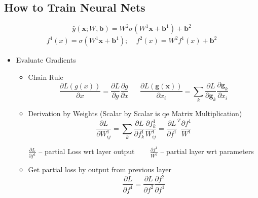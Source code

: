 \documentclass{beamer}
\begin{document}
	
	\subsection*{How to Train Neural Nets}
	
		\begin{frame}
			
				{\small
					$$
					\hat{y}(\bm{x}; W, \bm{b}) = W^2\sigma(W^1\bm{x} + \bm{b}^1 ) + \bm{b}^2
					$$
					\begin{align*}
						f^1 (x)  = \sigma(W^1\bm{x} + \bm{b}^1 ); ~~~~~
						f^2 (x)  = W^2f^1(x) + \bm{b}^2
					\end{align*}}
				
			\begin{itemize}
				\item Evaluate Gradients
				\begin{itemize}
					\item Chain Rule
					$$
						\frac {\partial L(g(x))}{\partial x} = 
							\frac{\partial L}{\partial g} 
							\frac{\partial g}{\partial x}~~~~~~~
						\frac {\partial L(\bm{g}(\bm{x}))}{\partial x_i} = 
							\sum_k \frac{\partial L}{\partial \bm{g}_k} 
							\frac{\partial \bm{g}_k}{\partial x_i}$$
					
					\item Derivation by Weights (Scalar by Scalar is qe Matrix Multiplication)
					$$
					\frac{\partial L}{\partial W^1_{ij}} = 
						\sum_k \frac{\partial L}{\partial f^1_k} 
						\frac{\partial f^1_k}{W^1_{ij}} = 
						\frac{\partial L}{\partial f^1}^T\frac{\partial f^1}{W^1}$$
					
				
					\hspace{-1cm} $\frac{\partial L}{\partial f^{1}}$ -- partial Loss wrt layer output ~~~
					$\frac{\partial f^1}{W^1}$ -- partial layer wrt parameters
					\vspace{0.2cm}
					\item Get partial loss by output from previous layer
						$$\frac{\partial L}{\partial f^{1}} = \frac{\partial L}{\partial f^{2}} \frac{\partial f^2}{\partial f^{1}}$$   
				
				\end{itemize}
			\end{itemize}
		\end{frame}
		
\end{document}
